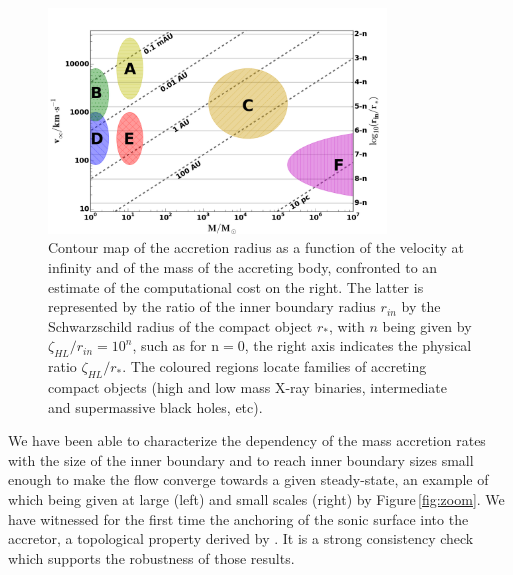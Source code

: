 \documentclass[
    a4paper, 12pt, onecolumn,
]{article}
\begin{document}
\begin{figure}
\begin{center}
\includegraphics[width=0.8\textwidth]{dimensions_odm.png}
\caption{Contour map of the accretion radius as a function of the velocity at infinity and of the mass of the accreting body, confronted to an estimate of the computational cost on the right. The latter is represented by the ratio of the inner boundary radius $r_{in}$ by the Schwarzschild radius of the compact object $r_{*}$, with $n$ being given by $\zeta_{HL} / r_{in} = 10^n$, such as for n$=$0, the right axis indicates the physical ratio $\zeta_{HL} / r_{*}$. The coloured regions locate families of accreting compact objects (high and low mass X-ray binaries, intermediate and supermassive black holes, etc).}
\label{fig:dimensions_odm}
\end{center}
\end{figure}

We have been able to characterize the dependency of the mass accretion rates with the size of the inner boundary and to reach inner boundary sizes small enough to make the flow converge towards a given steady-state, an example of which being given at large (left) and small scales (right) by Figure\,\ref{fig:zoom}. We have witnessed for the first time the anchoring of the sonic surface into the accretor, a topological property derived by \cite{Foglizzo1996}. It is a strong consistency check which supports the robustness of those results.
\end{document}
